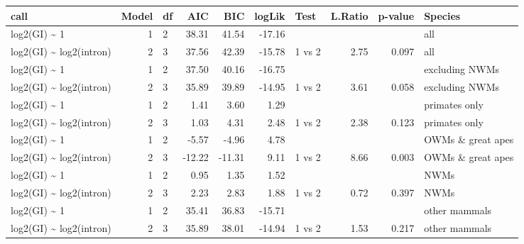 \begin{table}[ht]
\centering
\begin{tabular}{lrlrrrlrrl}
  \hline
call & Model & df & AIC & BIC & logLik & Test & L.Ratio & p-value & Species \\ 
  \hline
log2(GI) \~{} 1 &  1 & 2 & 38.31 & 41.54 & -17.16 &  &  &  & all \\ 
  log2(GI) \~{} log2(intron) &  2 & 3 & 37.56 & 42.39 & -15.78 & 1 vs 2 & 2.75 & 0.097 & all \\ 
   \hline
log2(GI) \~{} 1 &  1 & 2 & 37.50 & 40.16 & -16.75 &  &  &  & excluding NWMs \\ 
  log2(GI) \~{} log2(intron) &  2 & 3 & 35.89 & 39.89 & -14.95 & 1 vs 2 & 3.61 & 0.058 & excluding NWMs \\ 
   \hline
log2(GI) \~{} 1 &  1 & 2 & 1.41 & 3.60 & 1.29 &  &  &  & primates only \\ 
  log2(GI) \~{} log2(intron) &  2 & 3 & 1.03 & 4.31 & 2.48 & 1 vs 2 & 2.38 & 0.123 & primates only \\ 
   \hline
log2(GI) \~{} 1 &  1 & 2 & -5.57 & -4.96 & 4.78 &  &  &  & OWMs \& great apes \\ 
  log2(GI) \~{} log2(intron) &  2 & 3 & -12.22 & -11.31 & 9.11 & 1 vs 2 & 8.66 & 0.003 & OWMs \& great apes \\ 
   \hline
log2(GI) \~{} 1 &  1 & 2 & 0.95 & 1.35 & 1.52 &  &  &  & NWMs \\ 
  log2(GI) \~{} log2(intron) &  2 & 3 & 2.23 & 2.83 & 1.88 & 1 vs 2 & 0.72 & 0.397 & NWMs \\ 
   \hline
log2(GI) \~{} 1 &  1 & 2 & 35.41 & 36.83 & -15.71 &  &  &  & other mammals \\ 
  log2(GI) \~{} log2(intron) &  2 & 3 & 35.89 & 38.01 & -14.94 & 1 vs 2 & 1.53 & 0.217 & other mammals \\ 
   \hline
\end{tabular}
\end{table}
